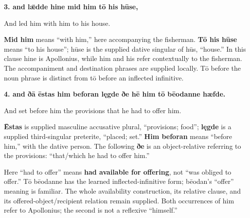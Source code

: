\textbf{3. and lǣdde hine mid him tō his hūse,}

And led him with him to his house.

\textbf{Mid him} means “with him,” here accompanying the fisherman. \textbf{Tō his hūse} means “to his house”; hūse is the supplied dative singular of hūs, “house.” In this clause hine is Apollonius, while him and his refer contextually to the fisherman. The accompaniment and destination phrases are supplied locally. Tō before the noun phrase is distinct from tō before an inflected infinitive.

\textbf{4. and ðā ēstas him beforan lęgde ðe hē him tō bēodanne hæfde.}

And set before him the provisions that he had to offer him.

\textbf{Ēstas} is supplied masculine accusative plural, “provisions; food”; \textbf{lęgde} is a supplied third-singular preterite, “placed; set.” \textbf{Him beforan} means “before him,” with the dative person. The following \textbf{ðe} is an object-relative referring to the provisions: “that/\allowbreak{}which he had to offer him.”

Here “had to offer” means \textbf{had available for offering}, not “was obliged to offer.” Tō bēodanne has the learned inflected-infinitive form; bēodan’s “offer” meaning is familiar. The whole availability construction, its relative clause, and its offered-object/\allowbreak{}recipient relation remain supplied. Both occurrences of him refer to Apollonius; the second is not a reflexive “himself.”

